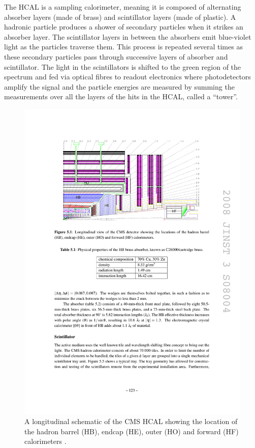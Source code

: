 The HCAL is a sampling calorimeter, meaning it is composed of alternating absorber layers (made of brass) and
scintillator layers (made of plastic). A hadronic particle produces a shower of secondary particles when it
strikes an absorber layer. The scintillator layers in between the absorbers emit blue-violet light as the
particles traverse them. This process is repeated several times as these secondary particles pass through
successive layers of absorber and scintillator. The light in the scintillators is shifted to the green region
of the spectrum and fed via optical fibres to readout electronics where photodetectors amplify the signal and
the particle energies are measured by summing the measurements over all the layers of the hits in
the HCAL, called a ``tower''.

\begin{figure}[hbtp]
   \centering
     \includegraphics[width=\textwidth]{Chapters/02_Detector/Images/HCAL.pdf}\hfill
     \caption[A longitudinal schematic of the CMS HCAL.]{A longitudinal schematic of the CMS HCAL showing the
     location of the hadron barrel (HB), endcap (HE), outer (HO) and forward (HF) calorimeters
     \cite{CMS_experiment}.}
     \label{fig:CMS_HCAL}
\end{figure} 


